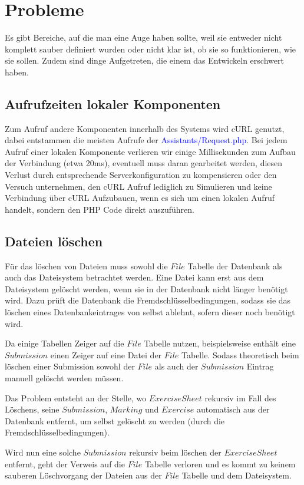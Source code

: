 \section{Probleme}
Es gibt Bereiche, auf die man eine Auge haben sollte, weil sie entweder nicht komplett sauber definiert wurden oder nicht klar ist, ob sie so funktionieren, wie sie sollen. Zudem sind dinge Aufgetreten, die einem das Entwickeln erschwert haben.

\subsection{Aufrufzeiten lokaler Komponenten}
Zum Aufruf andere Komponenten innerhalb des Systems wird cURL genutzt, dabei entstammen die meisten Aufrufe der 
\textcolor{blue}{Assistants/Request.php}. Bei jedem Aufruf einer lokalen Komponente verlieren wir einige Millisekunden zum Aufbau der Verbindung (etwa 20ms), eventuell muss daran gearbeitet werden, diesen Verlust durch entsprechende Serverkonfiguration zu kompensieren oder den Versuch unternehmen, den cURL Aufruf lediglich zu Simulieren und keine Verbindung über cURL Aufzubauen, wenn es sich um einen lokalen Aufruf handelt, sondern den PHP Code direkt auszuführen.

\subsection{Dateien löschen}
Für das löschen von Dateien muss sowohl die $File$ Tabelle der Datenbank als auch das Dateisystem betrachtet werden. Eine Datei kann erst aus dem Dateisystem gelöscht werden, wenn sie in der Datenbank nicht länger benötigt wird. Dazu prüft die Datenbank die Fremdschlüsselbedingungen, sodass sie das löschen eines Datenbankeintrages von selbst ablehnt, sofern dieser noch benötigt wird.

Da einige Tabellen Zeiger auf die $File$ Tabelle nutzen, beispielsweise enthält eine $Submission$ einen Zeiger auf eine Datei der $File$ Tabelle. Sodass theoretisch beim löschen einer Submission sowohl der $File$ als auch der $Submission$ Eintrag manuell gelöscht werden müssen.

Das Problem entsteht an der Stelle, wo $ExerciseSheet$ rekursiv im Fall des Löschens, seine $Submission$, $Marking$ und $Exercise$ automatisch aus der Datenbank entfernt, um selbst gelöscht zu werden (durch die Fremdschlüsselbedingungen).

Wird nun eine solche $Submission$ rekursiv beim löschen der $ExerciseSheet$ entfernt, geht der Verweis auf die $File$ Tabelle verloren und es kommt zu keinem sauberen Löschvorgang der Dateien aus der $File$ Tabelle und dem Dateisystem.

